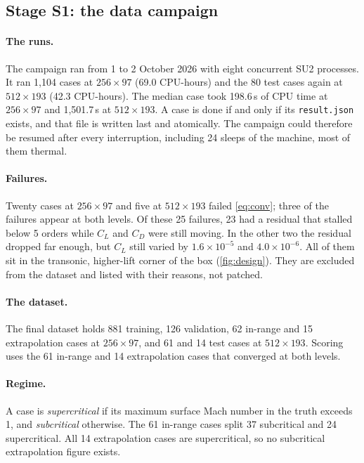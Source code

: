 \documentclass[11pt]{article}
\newcommand{\CL}{C_L}
\newcommand{\CD}{C_D}
\begin{document}
\subsection{Stage S1: the data campaign}

\paragraph{The runs.}
The campaign ran from 1 to 2 October 2026 with eight concurrent SU2 processes. It ran 1,104 cases
at $256\times97$ (69.0 CPU-hours) and the 80 test cases again at $512\times193$ (42.3 CPU-hours).
The median case took 198.6\,s of CPU time at $256\times97$ and 1,501.7\,s at $512\times193$.
A case is done if and only if its \texttt{result.json} exists, and that file is written last and
atomically. The campaign could therefore be resumed after every interruption, including 24
sleeps of the machine, most of them thermal.

\paragraph{Failures.}
Twenty cases at $256\times97$ and five at $512\times193$ failed \cref{eq:conv}; three of the
failures appear at both levels. Of these 25 failures, 23 had a residual that stalled below 5 orders
while $\CL$ and $\CD$ were still moving. In the other two the residual dropped far enough,
but $\CL$ still varied by $1.6\times10^{-5}$ and $4.0\times10^{-6}$. All of them sit in the
transonic, higher-lift corner of the box (\cref{fig:design}). They are excluded from the dataset
and listed with their reasons, not patched.

\paragraph{The dataset.}
The final dataset holds 881 training, 126 validation, 62 in-range and 15 extrapolation cases at
$256\times97$, and 61 and 14 test cases at $512\times193$. Scoring uses the 61 in-range and 14
extrapolation cases that converged at both levels.

\paragraph{Regime.}
A case is \emph{supercritical} if its maximum surface Mach number in the truth exceeds 1, and
\emph{subcritical} otherwise. The 61 in-range cases split 37 subcritical and 24 supercritical. All
14 extrapolation cases are supercritical, so no subcritical extrapolation figure exists.
\end{document}
